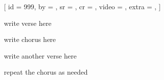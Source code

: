 [
    id    = {999},
    by    = {},
    sr    = {},
    cr    = {},
    video = {},
    extra = {},
]

\beginverse
write verse here
\endverse

\beginchorus
write chorus here
\endchorus

\beginverse
write another verse here
\endverse

\beginchorus
repeat the chorus as needed
\endchorus

\endsong